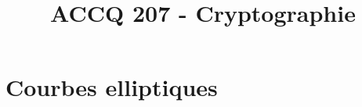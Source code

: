 \documentclass[a4paper,9pt]{article}
\title{\vspace{-1.2cm} \textbf{ACCQ 207 - Cryptographie}}
\begin{document}
\maketitle

\vspace{-1.5cm}

\section{Courbes elliptiques}
	
\end{document}
